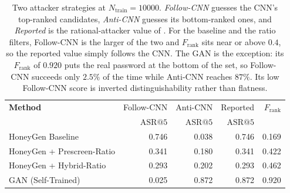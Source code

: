 \begin{table}[t]
  \centering
  \begin{tabular}{lrrrr}
    \toprule
    \textbf{Method} & Follow-CNN & Anti-CNN & Reported & $F_{\text{rank}}$ \\
     & $\mathrm{ASR}@5$ & $\mathrm{ASR}@5$ & $\mathrm{ASR}@5$ & \\
    \midrule
    HoneyGen Baseline & 0.746 & 0.038 & 0.746 & 0.169 \\
    HoneyGen + Prescreen-Ratio & 0.341 & 0.180 & 0.341 & 0.422 \\
    HoneyGen + Hybrid-Ratio & 0.293 & 0.202 & 0.293 & 0.462 \\
    GAN (Self-Trained) & 0.025 & 0.872 & 0.872 & 0.920 \\
    \bottomrule
  \end{tabular}
    \caption{Two attacker strategies at $N_{\text{train}}=10000$.
  \emph{Follow-CNN} guesses the CNN's top-ranked candidates,
  \emph{Anti-CNN} guesses its bottom-ranked ones, and \emph{Reported} is
  the rational-attacker value of . For the baseline and
  the ratio filters, Follow-CNN is the larger of the two and
  $F_{\text{rank}}$ sits near or above $0.4$, so the reported value
  simply follows the CNN. The GAN is the exception: its $F_{\text{rank}}$
  of $0.920$ puts the real password at the bottom of the set, so
  Follow-CNN succeeds only $2.5\%$ of the time while Anti-CNN reaches
  $87\%$. Its low Follow-CNN score is inverted distinguishability rather
  than flatness.}
  \label{tab:gan}
\end{table}
